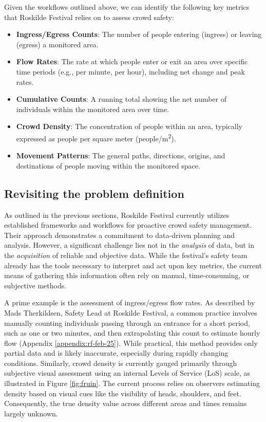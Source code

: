Given the workflows outlined above, we can identify the following key metrics that Roskilde Festival relies on to assess crowd safety:

\begin{itemize}
  \item \textbf{Ingress/Egress Counts}: The number of people entering (ingress) or leaving (egress) a monitored area.
  \item \textbf{Flow Rates}: The rate at which people enter or exit an area over specific time periods (e.g., per minute, per hour), including net change and peak rates.
  \item \textbf{Cumulative Counts}: A running total showing the net number of individuals within the monitored area over time.
  \item \textbf{Crowd Density}: The concentration of people within an area, typically expressed as people per square meter (people/m\textsuperscript{2}).
  \item \textbf{Movement Patterns}: The general paths, directions, origins, and destinations of people moving within the monitored space.
\end{itemize}

\subsection{Revisiting the problem definition}
As outlined in the previous sections, Roskilde Festival currently utilizes established frameworks and workflows for proactive crowd safety management. Their approach demonstrates a commitment to data-driven planning and analysis. However, a significant challenge lies not in the \textit{analysis} of data, but in the \textit{acquisition} of reliable and objective data. While the festival's safety team already has the tools necessary to interpret and act upon key metrics, the current means of gathering this information often rely on manual, time-consuming, or subjective methods.

A prime example is the assessment of ingress/egress flow rates. As described by Mads Therkildsen, Safety Lead at Roskilde Festival, a common practice involves manually counting individuals passing through an entrance for a short period, such as one or two minutes, and then extrapolating this count to estimate hourly flow (Appendix \ref{appendix:rf-feb-25}). While practical, this method provides only partial data and is likely inaccurate, especially during rapidly changing conditions. Similarly, crowd density is currently gauged primarily through subjective visual assessment using an internal Levels of Service (LoS) scale, as illustrated in Figure \ref{fig:fruin}. The current process relies on observers estimating density based on visual cues like the visibility of heads, shoulders, and feet. Consequently, the true density value across different areas and times remains largely unknown.

